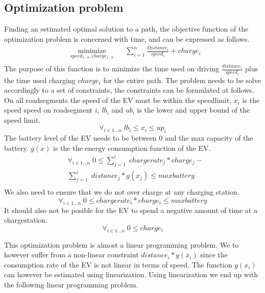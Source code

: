 \subsection{Optimization problem}
Finding an estimated optimal solution to a path, the objective function of the optimization problem is concerned with time, and can be expressed as follows.
\begin{equation}
\begin{aligned}
 & \underset{speed_{1 \dots n},charge_{1 \dots n}}
{\text{minimize}}
& & \sum_{i=1}^{n} \frac{Distance_i}{speed_i} + charge_i \\
\end{aligned}
\end{equation}\label{eq:objfunction}
The purpose of this function is to minimize the time used on driving $\frac{distance_i}{speed_i}$ plus the time used charging $charge_i$ for the entire path. 
The problem needs to be solve accordingly to a set of constraints, the constraints can be formulated at follows. \\
On all roadsegments the speed of the EV must be within the speedlimit, $x_i$ is the speed speed on roadsegment $i$, $lb_i$ and $ub_i$ is the lower and upper bound of the speed limit. 
\begin{equation}
\forall_{i \in 1 \dots n} \; lb_i \leq x_i \leq up_i
\end{equation}
The battery level of the EV needs to be between $0$ and the max capacity of the battery. $g(x)$ is the the energy consumption function of the EV. 
\begin{equation}
\begin{aligned}
& \forall_{i \in 1 \dots n} \; 0 \leq \sum_{j=1}^{i} \; chargerate_j*charge_j - \\
&  \sum_{j=1}^{i} \; distance_j*g(x_j) \leq maxbattery \\
 \end{aligned}
\end{equation}
We also need to ensure that we do not over charge at any charging station. 
\begin{equation}
\forall_{i \in 1 \dots n} \; 0 \leq chargerate_i*charge_i \leq maxbattery 
\end{equation}
It should also not be posible for the EV to spend a negative amount of time at a chargestation.
\begin{equation}
\forall_{i \in 1 \dots n} \; 0 \leq charge_i 
\end{equation}

This optimization problem is almost a linear programming problem. We to however suffer from a non-linear constraint $distance_i*g(x_i)$ since the consumption rate of the EV is not linear in terms of speed. The function $g(x_i)$ can however be estimated using linearization. Using linearization we end up with the following linear programming problem.  
 
